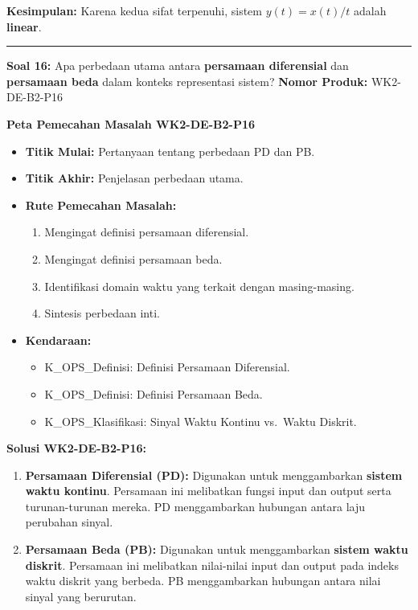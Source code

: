 \documentclass[
  letterpaper,
  DIV=11,
  numbers=noendperiod]{scrreprt}
\providecommand{\tightlist}{%
  \setlength{\itemsep}{0pt}\setlength{\parskip}{0pt}}
\begin{document}
\textbf{Kesimpulan:} Karena kedua sifat terpenuhi, sistem
\(y(t) = x(t)/t\) adalah \textbf{linear}.

\begin{center}\rule{0.5\linewidth}{0.5pt}\end{center}

\textbf{Soal 16:} Apa perbedaan utama antara \textbf{persamaan
diferensial} dan \textbf{persamaan beda} dalam konteks representasi
sistem? \textbf{Nomor Produk:} WK2-DE-B2-P16

\textbf{Peta Pemecahan Masalah WK2-DE-B2-P16}

\begin{itemize}
\tightlist
\item
  \textbf{Titik Mulai:} Pertanyaan tentang perbedaan PD dan PB.
\item
  \textbf{Titik Akhir:} Penjelasan perbedaan utama.
\item
  \textbf{Rute Pemecahan Masalah:}

  \begin{enumerate}
  \def\labelenumi{\arabic{enumi}.}
  \tightlist
  \item
    Mengingat definisi persamaan diferensial.
  \item
    Mengingat definisi persamaan beda.
  \item
    Identifikasi domain waktu yang terkait dengan masing-masing.
  \item
    Sintesis perbedaan inti.
  \end{enumerate}
\item
  \textbf{Kendaraan:}

  \begin{itemize}
  \tightlist
  \item
    K\_OPS\_Definisi: Definisi Persamaan Diferensial.
  \item
    K\_OPS\_Definisi: Definisi Persamaan Beda.
  \item
    K\_OPS\_Klasifikasi: Sinyal Waktu Kontinu vs.~Waktu Diskrit.
  \end{itemize}
\end{itemize}

\textbf{Solusi WK2-DE-B2-P16:}

\begin{enumerate}
\def\labelenumi{\arabic{enumi}.}
\tightlist
\item
  \textbf{Persamaan Diferensial (PD):} Digunakan untuk menggambarkan
  \textbf{sistem waktu kontinu}. Persamaan ini melibatkan fungsi input
  dan output serta turunan-turunan mereka. PD menggambarkan hubungan
  antara laju perubahan sinyal.
\item
  \textbf{Persamaan Beda (PB):} Digunakan untuk menggambarkan
  \textbf{sistem waktu diskrit}. Persamaan ini melibatkan nilai-nilai
  input dan output pada indeks waktu diskrit yang berbeda. PB
  menggambarkan hubungan antara nilai sinyal yang berurutan.
\end{enumerate}
\end{document}
